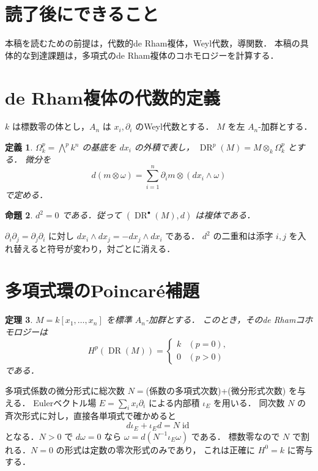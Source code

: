 \documentclass[a5paper,10pt,onecolumn]{jsarticle}
\makeatletter
\theoremstyle{mathnotetheorem}
\newtheorem{theorem}{定理}[section]
\newtheorem{definition}[theorem]{定義}
\newtheorem{proposition}[theorem]{命題}
\renewcommand{\proofname}{証明}
\renewenvironment{proof}[1][\proofname]{%
  \par\pushQED{\qed}\normalfont\topsep4\p@\@plus2\p@\relax
  \trivlist\item[\hskip\labelsep\bfseries #1]\ignorespaces
}{\popQED\endtrivlist\@endpefalse}
\makeatother
\begin{document}
\section*{読了後にできること}
本稿を読むための前提は，代数的de Rham複体，Weyl代数，導関数．
本稿の具体的な到達課題は，多項式のde Rham複体のコホモロジーを計算する．

\section{de Rham複体の代数的定義}
$k$ は標数零の体とし，$A_n$ は $x_i,\partial_i$ のWeyl代数とする．
$M$ を左 $A_n$-加群とする．
\begin{definition}
$\Omega_k^p=\bigwedge^p k^n$ の基底を $dx_i$ の外積で表し，
$\operatorname{DR}^p(M)=M\otimes_k\Omega_k^p$ とする．
微分を
\[
 d(m\otimes\omega)=\sum_{i=1}^n\partial_i m\otimes(dx_i\wedge\omega)
\]
で定める．
\end{definition}
\begin{proposition}
$d^2=0$ である．従って $(\operatorname{DR}^{\bullet}(M),d)$ は複体である．
\end{proposition}
\begin{proof}
$\partial_i\partial_j=\partial_j\partial_i$ に対し
$dx_i\wedge dx_j=-dx_j\wedge dx_i$ である．
$d^2$ の二重和は添字 $i,j$ を入れ替えると符号が変わり，対ごとに消える．
\end{proof}
\section{多項式環のPoincar\'e補題}
\begin{theorem}
$M=k[x_1,\ldots,x_n]$ を標準 $A_n$-加群とする．
このとき，そのde Rhamコホモロジーは
\[
 H^p(\operatorname{DR}(M))=
 \begin{cases}k&(p=0),\\0&(p>0)\end{cases}
\]
である．
\end{theorem}
\begin{proof}
多項式係数の微分形式に総次数
$N=$(係数の多項式次数)+(微分形式次数) を与える．
Eulerベクトル場 $E=\sum_i x_i\partial_i$ による内部積 $\iota_E$ を用いる．
同次数 $N$ の斉次形式に対し，直接各単項式で確かめると
\[
 d\iota_E+\iota_Ed=N\operatorname{id}
\]
となる．$N>0$ で $d\omega=0$ なら
$\omega=d(N^{-1}\iota_E\omega)$ である．
標数零なので $N$ で割れる．$N=0$ の形式は定数の零次形式のみであり，
これは正確に $H^0=k$ に寄与する．
\end{proof}
\end{document}
